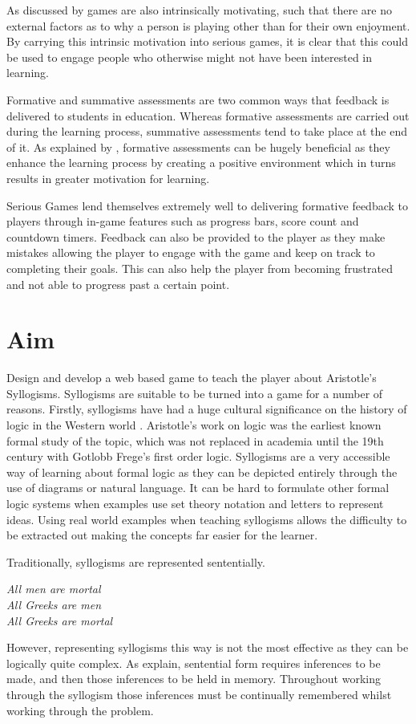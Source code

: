 \documentclass[12pt,a4paper]{report}
\newenvironment{tightcenter}{%
  \setlength\topsep{0pt}
  \setlength\parskip{0pt}
  \begin{center}
}{%
  \end{center}
}
\begin{document}
As discussed by \cite{malone1981toward} games are also intrinsically motivating, such that there are no external factors as to why a person is playing other than for their own enjoyment. By carrying this intrinsic motivation into serious games, it is clear that this could be used to engage people who otherwise might not have been interested in learning. 

Formative and summative assessments are two common ways that feedback is delivered to students in education. Whereas formative assessments are carried out during the learning process, summative assessments tend to take place at the end of it. As explained by \cite{irons2007enhancing}, formative assessments can be hugely beneficial as they enhance the learning process by creating a positive environment which in turns results in greater motivation for learning. 

Serious Games lend themselves extremely well to delivering formative feedback to players through in-game features such as progress bars, score count and countdown timers. Feedback can also be provided to the player as they make mistakes allowing the player to engage with the game and keep on track to completing their goals. This can also help the player from becoming frustrated and not able to progress past a certain point.


\section{Aim}
Design and develop a web based game to teach the player about Aristotle's Syllogisms.
Syllogisms are suitable to be turned into a game for a number of reasons. Firstly, syllogisms have had a huge cultural significance on the history of logic in the Western world \citep{sep-aristotle-logic}. Aristotle's work on logic was the earliest known formal study of the topic, which was not replaced in academia until the 19th century with Gotlobb Frege's first order logic.
Syllogisms are a very accessible way of learning about formal logic as they can be depicted entirely through the use of diagrams or natural language. It can be hard to formulate other formal logic systems when examples use set theory notation and letters to represent ideas.
Using real world examples when teaching syllogisms allows the difficulty to be extracted out making the concepts far easier for the learner. 

Traditionally, syllogisms are represented sententially.
\bigbreak
\begin{tightcenter}
\textit{All men are mortal}\\
\textit{All Greeks are men}\\
\textit{All Greeks are mortal}\\
\end{tightcenter}
\bigbreak
However, representing syllogisms this way is not the most effective as they can be logically quite complex. As \cite{larkin1987diagram} explain, sentential form requires inferences to be made, and then those inferences to be held in memory. Throughout working through the syllogism those inferences must be continually remembered whilst working through the problem.
\end{document}
